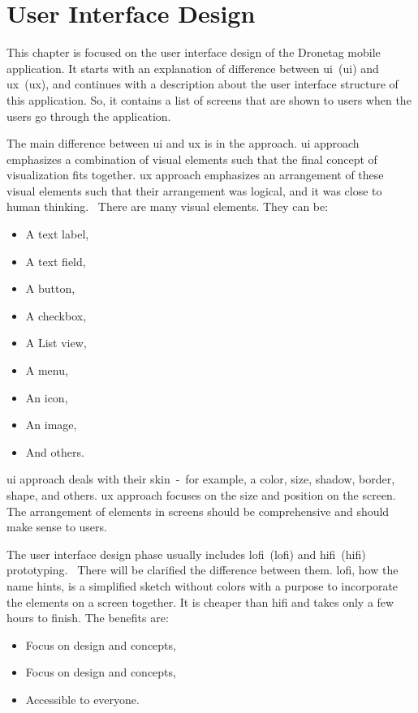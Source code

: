 \chapter{User Interface Design}\label{ch:user-interface-design}
This chapter is focused on the user interface design of the Dronetag mobile application.
It starts with an explanation of difference between \acrshort{ui}~(\acrlong{ui}) and \acrshort{ux}~(\acrlong{ux}), and continues with a description about the user interface structure of this application.
So, it contains a list of screens that are shown to users when the users go through the application.

The main difference between \acrshort{ui} and \acrshort{ux} is in the approach.
\acrshort{ui} approach emphasizes a combination of visual elements such that the final concept of visualization fits together.
\acrshort{ux} approach emphasizes an arrangement of these visual elements such that their arrangement was logical, and it was close to human thinking.~\cite{prototyping}
There are many visual elements.
They can be:
\begin{itemize}
    \item A text label,
    \item A text field,
    \item A button,
    \item A checkbox,
    \item A List view,
    \item A menu,
    \item An icon,
    \item An image,
    \item And others.
\end{itemize}
\acrshort{ui} approach deals with their skin~-~for example, a color, size, shadow, border, shape, and others.
\acrshort{ux} approach focuses on the size and position on the screen.
The arrangement of elements in screens should be comprehensive and should make sense to users.

The user interface design phase usually includes \acrshort{lofi}~(\acrlong{lofi}) and \acrshort{hifi}~(\acrlong{hifi}) prototyping.~\cite{effectivePrototyping}
There will be clarified the difference between them.
\acrshort{lofi}, how the name hints, is a simplified sketch without colors with a purpose to incorporate the elements on a screen together.
It is cheaper than \acrshort{hifi} and takes only a few hours to finish.
The benefits are:
\begin{itemize}
    \item Focus on design and concepts,
    \item Focus on design and concepts,
    \item Accessible to everyone.~\cite{hiFiLoFiPrototypeArticle}
\end{itemize}

